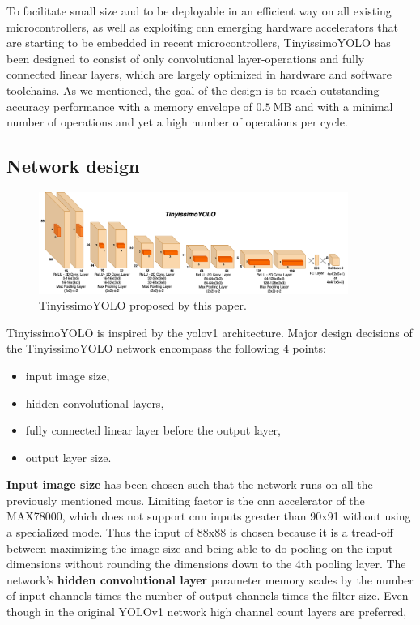 \documentclass[conference]{IEEEtran}
\begin{document}
To facilitate small size and to be deployable in an efficient way on all existing microcontrollers, as well as exploiting  \gls{cnn} emerging hardware accelerators that are starting to be embedded in recent microcontrollers, TinyissimoYOLO has been designed to consist of only convolutional layer-operations and fully connected linear layers, which are largely optimized in hardware and software toolchains. As we mentioned, the goal of the design is to reach outstanding accuracy performance with a memory envelope of $\SI{0.5}{\text{MB}}$ and with a minimal number of operations and yet a high number of operations per cycle.  


\subsection{Network design}
\begin{figure}[htbp]
\centerline{\includegraphics[width=0.9\textwidth]{tinyissimoYOLO.png}}
\caption{TinyissimoYOLO proposed by this paper.}
\label{fig:tinyissimoYOLO}
\end{figure} 
TinyissimoYOLO is inspired by the \gls{yolo}v1 \cite{redmon_you_2016} architecture. Major design decisions of the TinyissimoYOLO network encompass the following 4 points:
\begin{itemize}
    \item input image size,
    \item hidden convolutional layers,
    \item fully connected linear layer before the output layer,
    \item output layer size.
\end{itemize}
\textbf{Input image size} has been chosen such that the network runs on all the previously mentioned \glspl{mcu}. Limiting factor is the \gls{cnn} accelerator of the MAX78000, which does not support \gls{cnn} inputs greater than 90x91 without using a specialized mode. Thus the input of 88x88 is chosen because it is a tread-off between maximizing the image size and being able to do pooling on the input dimensions without rounding the dimensions down to the 4th pooling layer. The network's \textbf{hidden convolutional layer} parameter memory scales by the number of input channels times the number of output channels times the filter size. Even though in the original YOLOv1 network high channel count layers are preferred, 
\end{document}
